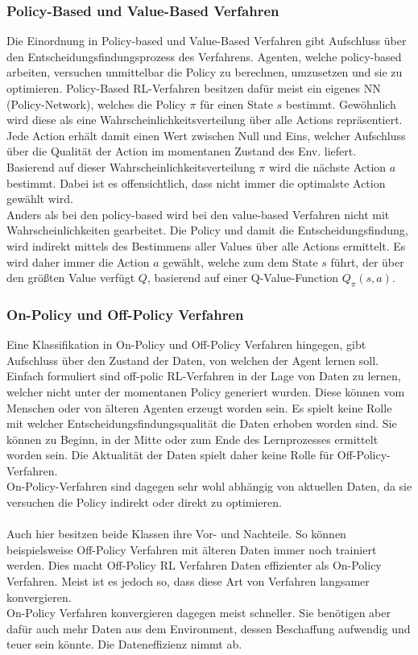 \subsubsection{Policy-Based und Value-Based Verfahren} \label{sec:RL_policy_value}
Die Einordnung in Policy-based und Value-Based Verfahren gibt Aufschluss über den Entscheidungsfindungsprozess des Verfahrens.
Agenten, welche policy-based arbeiten, versuchen unmittelbar die Policy zu berechnen, umzusetzen und sie zu optimieren. Policy-Based RL-Verfahren besitzen dafür meist ein eigenes NN (Policy-Network), welches die Policy $\pi$ für einen State $s$ bestimmt.
Gewöhnlich wird diese als eine Wahrscheinlichkeitsverteilung über alle Actions repräsentiert. Jede Action erhält damit einen Wert zwischen Null und Eins, welcher Aufschluss über die Qualität der Action im momentanen Zustand des Env. liefert. \cite[S. 100]{DRL_Lapan} \\
Basierend auf dieser Wahrscheinlichkeitsverteilung $\pi$ wird die nächste Action $a$ bestimmt. Dabei ist es offensichtlich, dass nicht immer die optimalste Action gewählt wird.\\
Anders als bei den policy-based wird bei den value-based Verfahren nicht mit Wahrscheinlichkeiten gearbeitet. Die Policy und damit die Entscheidungsfindung, wird indirekt mittels des Bestimmens aller Values über alle Actions ermittelt. Es wird daher immer die Action $a$ gewählt, welche zum dem State $s$ führt, der über den größten Value verfügt $Q$, basierend auf einer Q-Value-Function $Q_\pi(s,a)$. \cite[S. 100]{DRL_Lapan}

\subsubsection{On-Policy und Off-Policy Verfahren}
Eine Klassifikation in On-Policy und Off-Policy Verfahren hingegen, gibt Aufschluss über den Zustand der Daten, von welchen der Agent lernen soll. 
Einfach formuliert sind off-polic RL-Verfahren in der Lage von Daten zu lernen, welcher nicht unter der momentanen Policy generiert wurden. Diese können vom Menschen oder von älteren Agenten erzeugt worden sein. Es spielt keine Rolle mit welcher Entscheidungsfindungsqualität die Daten erhoben worden sind. Sie können zu Beginn, in der Mitte oder zum Ende des Lernprozesses ermittelt worden sein. Die Aktualität der Daten spielt daher keine Rolle für Off-Policy-Verfahren. \cite[S. 210 f.]{DRL_Lapan}\\
On-Policy-Verfahren sind dagegen sehr wohl abhängig von aktuellen Daten, da sie versuchen die Policy indirekt oder direkt zu optimieren.\\
\\Auch hier besitzen beide Klassen ihre Vor- und Nachteile. So können beispielsweise Off-Policy Verfahren mit älteren Daten immer noch trainiert werden. Dies macht Off-Policy RL Verfahren Daten effizienter als On-Policy Verfahren. Meist ist es jedoch so, dass diese Art von Verfahren langsamer konvergieren.\\
On-Policy Verfahren konvergieren dagegen meist schneller. Sie benötigen aber dafür auch mehr Daten aus dem Environment, dessen Beschaffung aufwendig und teuer sein könnte. Die Dateneffizienz nimmt ab.\cite[S. 210 f.]{DRL_Lapan}

